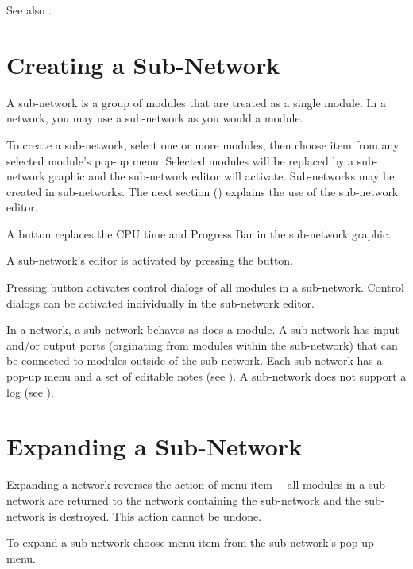 See also .

\section{Creating a Sub-Network}
\label{sec:crsubnet}

A sub-network is a group of modules that are treated as a single
module.  In a network, you may use a sub-network as you would a
module.

To create a sub-network, select one or more modules, then choose item
 from any selected module's pop-up menu.
Selected modules will be replaced by a sub-network graphic and the
sub-network editor will activate.  Sub-networks may be created in
sub-networks.  The next section () explains the use of the sub-network
editor.

A  button replaces the CPU time and Progress
Bar in the sub-network graphic.

A sub-network's editor is activated by pressing the
 button.

Pressing button  activates control dialogs of all
modules in a sub-network.  Control dialogs can be activated
individually in the sub-network editor.

In a network, a sub-network behaves as does a module.  A sub-network
has input and/or output ports (orginating from modules within the
sub-network) that can be connected to modules outside of the
sub-network.  Each sub-network has a pop-up menu and a set of editable
notes (see ).  A sub-network does not support a log (see
).

\section{Expanding a Sub-Network}
\label{sec:expsubnet}

Expanding a network reverses the action of menu item ---all modules in a sub-network are returned to the
network containing the sub-network and the sub-network is destroyed.
This action cannot be undone.

To expand a sub-network choose menu item 
from the sub-network's pop-up menu.

